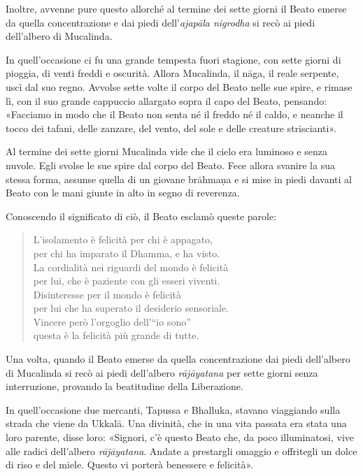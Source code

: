 Inoltre, avvenne pure questo allorché al termine dei sette giorni il Beato
emerse da quella concentrazione e dai piedi dell’\emph{ajapāla nigrodha} si recò
ai piedi dell’albero di Mucalinda.

In quell’occasione ci fu una grande tempesta fuori stagione, con sette giorni di
pioggia, di venti freddi e oscurità. Allora Mucalinda, il nāga, il reale
serpente, uscì dal suo regno. Avvolse sette volte il corpo del Beato nelle sue
spire, e rimase lì, con il suo grande cappuccio allargato sopra il capo del
Beato, pensando: «Facciamo in modo che il Beato non senta né il freddo né il
caldo, e neanche il tocco dei tafani, delle zanzare, del vento, del sole e delle
creature striscianti».

Al termine dei sette giorni Mucalinda vide che il cielo era luminoso e senza
nuvole. Egli svolse le sue spire dal corpo del Beato. Fece allora svanire la sua
stessa forma, assunse quella di un giovane brāhmaṇa e si mise in piedi davanti
al Beato con le mani giunte in alto in segno di reverenza.

Conoscendo il significato di ciò, il Beato esclamò queste parole:

\begin{quote}
L’isolamento è felicità per chi è appagato, \\
per chi ha imparato il Dhamma, e ha visto. \\
La cordialità nei riguardi del mondo è felicità \\
per lui, che è paziente con gli esseri viventi. \\
Disinteresse per il mondo è felicità \\
per lui che ha superato il desiderio sensoriale. \\
Vincere però l’orgoglio dell’“io sono” \\
questa è la felicità più grande di tutte.
\end{quote}


Una volta, quando il Beato emerse da quella concentrazione dai piedi dell’albero
di Mucalinda si recò ai piedi dell’albero \emph{rājāyatana} per sette giorni
senza interruzione, provando la beatitudine della Liberazione.

\label{pag41}%
In quell’occasione due mercanti, Tapussa e Bhalluka, stavano viaggiando sulla
strada che viene da Ukkalā. Una divinità, che in una vita passata era stata una
loro parente, disse loro: «Signori, c’è questo Beato che, da poco illuminatosi,
vive alle radici dell’albero \emph{rājāyatana}. Andate a prestargli omaggio e
offritegli un dolce di riso e del miele. Questo vi porterà benessere e
felicità».

